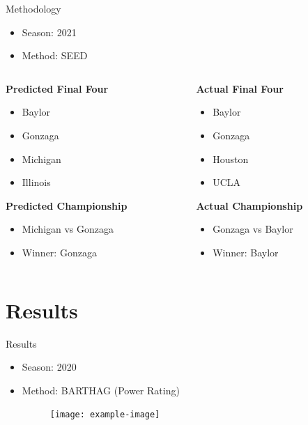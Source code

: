 \documentclass{beamer}
\begin{document}
\begin{frame}{Methodology}
\begin{itemize}
  \item Season: 2021
  \item Method: SEED
\end{itemize}

\begin{columns}[T] %
\begin{column}{0.5\textwidth} %
  \textbf{Predicted Final Four}
  \begin{itemize}
    \item Baylor
    \item Gonzaga
    \item Michigan
    \item Illinois
  \end{itemize}
  \textbf{Predicted Championship}
  \begin{itemize}
    \item Michigan vs Gonzaga
    \item Winner: Gonzaga
    \end{itemize}
\end{column}
\begin{column}{0.5\textwidth} %
  \textbf{Actual Final Four}
  \begin{itemize}
    \item Baylor
    \item Gonzaga
    \item Houston
    \item UCLA
  \end{itemize}
  \textbf{Actual Championship}
  \begin{itemize}
    \item Gonzaga vs Baylor
    \item Winner: Baylor
    \end{itemize}
\end{column}
\end{columns}
\end{frame}

\section{Results}

\begin{frame}{Results}
\begin{itemize}
  \item Season: 2020 
  \item Method: BARTHAG (Power Rating)
  
      \begin{figure}
      \centering
      \texttt{[image: example-image]} %
    \end{figure}
    
\end{itemize}
\end{frame}
\end{document}
